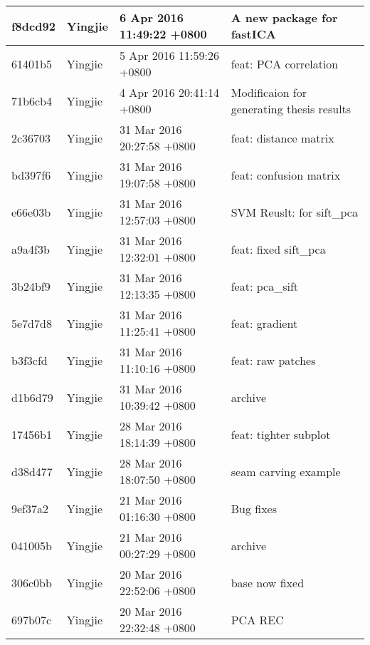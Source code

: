 \begin{longtable}{@{\extracolsep{\fill}}l|l|l|l@{}}
    f8dcd92  & Yingjie &  6 Apr 2016 11:49:22 +0800  & A new package for fastICA                            \\ \hline
    61401b5  & Yingjie &  5 Apr 2016 11:59:26 +0800  & feat: PCA correlation                                \\ \hline
    71b6cb4  & Yingjie &  4 Apr 2016 20:41:14 +0800  & Modificaion for generating thesis results            \\ \hline
    2c36703  & Yingjie &  31 Mar 2016 20:27:58 +0800 & feat: distance matrix                                \\ \hline
    bd397f6  & Yingjie &  31 Mar 2016 19:07:58 +0800 & feat: confusion matrix                               \\ \hline
    e66e03b  & Yingjie &  31 Mar 2016 12:57:03 +0800 & SVM Reuslt: for sift\_pca                            \\ \hline
    a9a4f3b  & Yingjie &  31 Mar 2016 12:32:01 +0800 & feat: fixed sift\_pca                                \\ \hline
    3b24bf9  & Yingjie &  31 Mar 2016 12:13:35 +0800 & feat: pca\_sift                                      \\ \hline
    5e7d7d8  & Yingjie &  31 Mar 2016 11:25:41 +0800 & feat: gradient                                       \\ \hline
    b3f3cfd  & Yingjie &  31 Mar 2016 11:10:16 +0800 & feat: raw patches                                    \\ \hline
    d1b6d79  & Yingjie &  31 Mar 2016 10:39:42 +0800 & archive                                              \\ \hline
    17456b1  & Yingjie &  28 Mar 2016 18:14:39 +0800 & feat: tighter subplot                                \\ \hline
    d38d477  & Yingjie &  28 Mar 2016 18:07:50 +0800 & seam carving example                                 \\ \hline
    9ef37a2  & Yingjie &  21 Mar 2016 01:16:30 +0800 & Bug fixes                                            \\ \hline
    041005b  & Yingjie &  21 Mar 2016 00:27:29 +0800 & archive                                              \\ \hline
    306c0bb  & Yingjie &  20 Mar 2016 22:52:06 +0800 & base now fixed                                       \\ \hline
    697b07c  & Yingjie &  20 Mar 2016 22:32:48 +0800 & PCA REC                                              \\ \hline

\end{longtable}
